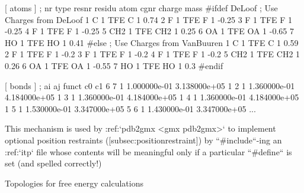     [ atoms ]
    ; nr     type     resnr    residu     atom      cgnr      charge        mass
    #ifdef DeLoof
    ; Use Charges from DeLoof
       1        C        1        TFE        C         1        0.74        
       2        F        1        TFE        F         1       -0.25        
       3        F        1        TFE        F         1       -0.25        
       4        F        1        TFE        F         1       -0.25        
       5      CH2        1        TFE      CH2         1        0.25        
       6       OA        1        TFE       OA         1       -0.65        
       7       HO        1        TFE       HO         1        0.41        
    #else
    ; Use Charges from VanBuuren
       1        C        1        TFE        C         1        0.59        
       2        F        1        TFE        F         1       -0.2         
       3        F        1        TFE        F         1       -0.2         
       4        F        1        TFE        F         1       -0.2         
       5      CH2        1        TFE      CH2         1        0.26        
       6       OA        1        TFE       OA         1       -0.55        
       7       HO        1        TFE       HO         1        0.3         
    #endif

    [ bonds ]
    ;  ai    aj funct           c0           c1
        6     7     1 1.000000e-01 3.138000e+05 
        1     2     1 1.360000e-01 4.184000e+05 
        1     3     1 1.360000e-01 4.184000e+05 
        1     4     1 1.360000e-01 4.184000e+05 
        1     5     1 1.530000e-01 3.347000e+05 
        5     6     1 1.430000e-01 3.347000e+05 
    ...

This mechanism is used by :ref:`pdb2gmx <gmx pdb2gmx>` to implement optional position
restraints ([subsec:positionrestraint]) by ``#include``-ing an :ref:`itp` file
whose contents will be meaningful only if a particular ``#define`` is set
(and spelled correctly!)

Topologies for free energy calculations
~~~~~~~~~~~~~~~~~~~~~~~~~~~~~~~~~~~~~~~

